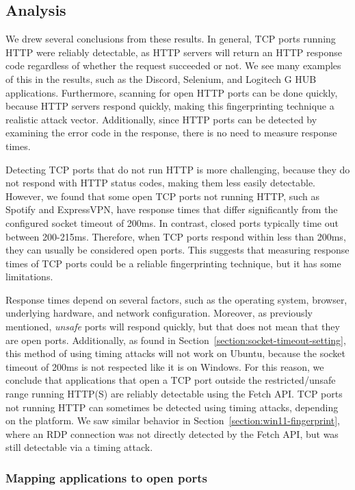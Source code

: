 \subsection{Analysis}

We drew several conclusions from these results. In general, TCP ports running HTTP were reliably detectable, as HTTP servers will return an HTTP response code regardless of whether the request succeeded or not. We see many examples of this in the results, such as the Discord, Selenium, and Logitech G HUB applications. Furthermore, scanning for open HTTP ports can be done quickly, because HTTP servers respond quickly, making this fingerprinting technique a realistic attack vector. Additionally, since HTTP ports can be detected by examining the error code in the response, there is no need to measure response times.

Detecting TCP ports that do not run HTTP is more challenging, because they do not respond with HTTP status codes, making them less easily detectable. However, we found that some open TCP ports not running HTTP, such as Spotify and ExpressVPN, have response times that differ significantly from the configured socket timeout of 200ms. In contrast, closed ports typically time out between 200-215ms. Therefore, when TCP ports respond within less than 200ms, they can usually be considered open ports. This suggests that measuring response times of TCP ports could be a reliable fingerprinting technique, but it has some limitations.

Response times depend on several factors, such as the operating system, browser, underlying hardware, and network configuration. Moreover, as previously mentioned, \emph{unsafe} ports will respond quickly, but that does not mean that they are open ports. Additionally, as found in Section~\ref{section:socket-timeout-setting}, this method of using timing attacks will not work on Ubuntu, because the socket timeout of 200ms is not respected like it is on Windows. 
For this reason, we conclude that applications that open a TCP port outside the restricted/unsafe range running HTTP(S) are reliably detectable using the Fetch API. TCP ports not running HTTP can sometimes be detected using timing attacks, depending on the platform. We saw similar behavior in Section~\ref{section:win11-fingerprint}, where an RDP connection was not directly detected by the Fetch API, but was still detectable via a timing attack.

\subsubsection{Mapping applications to open ports}

